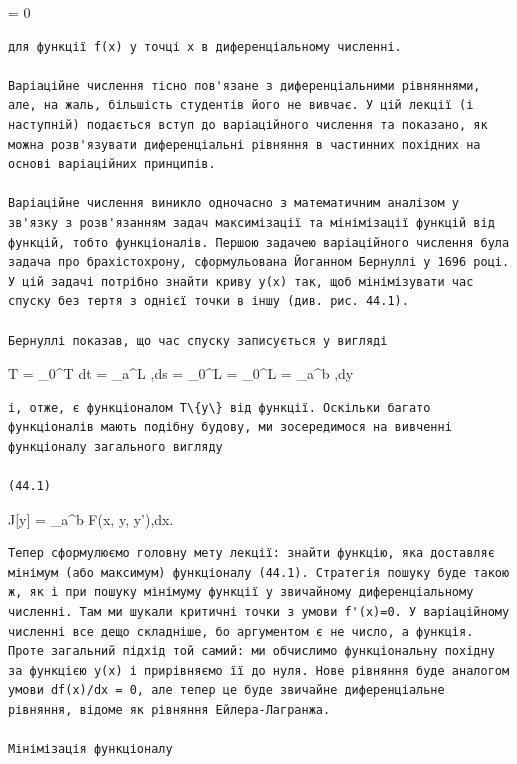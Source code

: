 \documentclass[
  ukrainian,
]{article}
\begin{document}
 = 0

\begin{verbatim}
для функції f(x) у точці x в диференціальному численні.

Варіаційне числення тісно пов'язане з диференціальними рівняннями, але, на жаль, більшість студентів його не вивчає. У цій лекції (і наступній) подається вступ до варіаційного числення та показано, як можна розв'язувати диференціальні рівняння в частинних похідних на основі варіаційних принципів.

Варіаційне числення виникло одночасно з математичним аналізом у зв'язку з розв'язанням задач максимізації та мінімізації функцій від функцій, тобто функціоналів. Першою задачею варіаційного числення була задача про брахістохрону, сформульована Йоганном Бернуллі у 1696 році. У цій задачі потрібно знайти криву y(x) так, щоб мінімізувати час спуску без тертя з однієї точки в іншу (див. рис. 44.1).

Бернуллі показав, що час спуску записується у вигляді
\end{verbatim}

T = \int\_0\^{}T dt = \int\_a\^{}L ,ds = \int\_0\^{}L
 =  \int\_0\^{}L  =
 \int\_a\^{}b ,dy

\begin{verbatim}
і, отже, є функціоналом T\{y\} від функції. Оскільки багато функціоналів мають подібну будову, ми зосередимося на вивченні функціоналу загального вигляду

(44.1)
\end{verbatim}

J{[}y{]} = \int\_a\^{}b F(x, y, y'),dx.

\begin{verbatim}
Тепер сформулюємо головну мету лекції: знайти функцію, яка доставляє мінімум (або максимум) функціоналу (44.1). Стратегія пошуку буде такою ж, як і при пошуку мінімуму функції у звичайному диференціальному численні. Там ми шукали критичні точки з умови f'(x)=0. У варіаційному численні все дещо складніше, бо аргументом є не число, а функція. Проте загальний підхід той самий: ми обчислимо функціональну похідну за функцією y(x) і прирівняємо її до нуля. Нове рівняння буде аналогом умови df(x)/dx = 0, але тепер це буде звичайне диференціальне рівняння, відоме як рівняння Ейлера-Лагранжа.

Мінімізація функціоналу
\end{verbatim}
\end{document}
